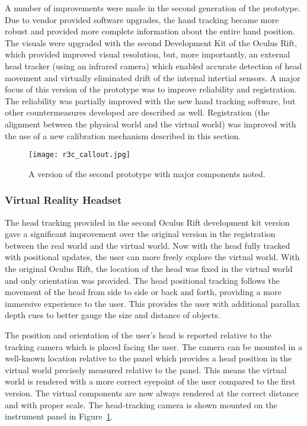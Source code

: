 A number of improvements were made in the second generation of the prototype.
Due to vendor provided software upgrades, the hand tracking became more robust and provided more complete information about the entire hand position.
The visuals were upgraded with the second Development Kit of the Oculus Rift, which provided improved visual resolution, but, more importantly, an external head tracker (using an infrared camera) which enabled accurate detection of head movement and virtually eliminated drift of the internal intertial sensors.
A major focus of this version of the prototype was to improve reliability and registration.
The reliability was partially improved with the new hand tracking software, but other countermeasures developed are described as well.
Registration (the alignment between the physical world and the virtual world) was improved with the use of a new calibration mechanism described in this section.

\begin{figure}
    \centering
    \texttt{[image: r3c\_callout.jpg]}
    \caption{A version of the second prototype with major components noted.}
    \label{fig:r3c_callout}
\end{figure}

\subsubsection{Virtual Reality Headset}

The head tracking provided in the second Oculus Rift development kit version gave a significant improvement over the original version in the registration between the real world and the virtual world.
Now with the head fully tracked with positional updates, the user can more freely explore the virtual world.
With the original Oculus Rift, the location of the head was fixed in the virtual world and only orientation was provided.
The head positional tracking follows the movement of the head from side to side or back and forth, providing a more immersive experience to the user.
This provides the user with additional parallax depth cues to better gauge the size and distance of objects.

The position and orientation of the user's head is reported relative to the tracking camera which is placed facing the user.
The camera can be mounted in a well-known location relative to the panel which provides a head position in the virtual world precisely measured relative to the panel.
This means the virtual world is rendered with a more correct eyepoint of the user compared to the first version.
The virtual components are now always rendered at the correct distance and with proper scale.
The head-tracking camera is shown mounted on the instrument panel in Figure~\ref{fig:r3c_callout}.


